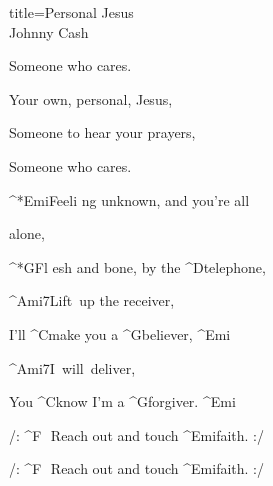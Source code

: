 \begin{song}{title=\predtitle\centering Personal Jesus \\\large Johnny Cash  \vspace*{-0.3cm}}
\begin{centerjustified}
\begin{varwidth}[t]{0.48\textwidth}
	Someone who cares.

	Your own, personal, Jesus,

	Someone to hear your prayers,

	Someone who cares.


\sloka
	^*{Emi}Feeli ng unknown, and you're all 

	alone,

	^*{G}Fl esh and bone, by the ^{D{\z}}telephone,

	^{Ami7\z}Lift~up the receiver,

	I'll ^{C{\z}}make you a ^{G}believer, ^{Emi}

	^{Ami7\z}I~will~deliver,
	
	You ^{C{\z}}know I'm a ^{G}forgiver. ^{Emi}


	/: ^{F\sharp\,\,\,\,}Reach out and touch ^{Emi}faith. :/
	
	/: ^{F\sharp\,\,\,\,}Reach out and touch ^{Emi}faith. :/

\end{varwidth}

\end{centerjustified}
\setcounter{Slokočet}{0}
\end{song}	
